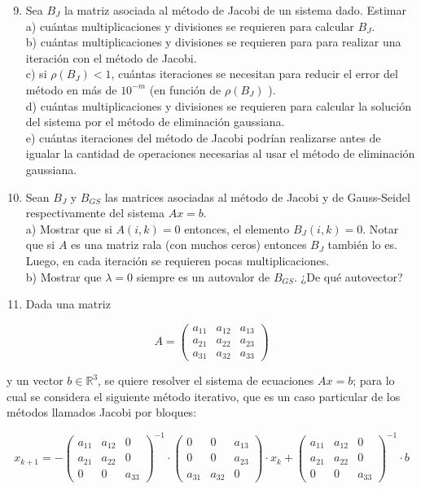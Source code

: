 \documentclass[10pt]{book}
\begin{document}
\begin{enumerate}
  \setcounter{enumi}{8}
  \item Sea $B_{J}$ la matriz asociada al método de Jacobi de un sistema dado. Estimar\\
a) cuántas multiplicaciones y divisiones se requieren para calcular $B_{J}$.\\
b) cuántas multiplicaciones y divisiones se requieren para para realizar una iteración con el método de Jacobi.\\
c) si $\rho\left(B_{J}\right)<1$, cuántas iteraciones se necesitan para reducir el error del método en más de $10^{-m}$ (en función de $\rho\left(B_{J}\right)$ ).\\
d) cuántas multiplicaciones y divisiones se requieren para calcular la solución del sistema por el método de eliminación gaussiana.\\
e) cuántas iteraciones del método de Jacobi podrían realizarse antes de igualar la cantidad de operaciones necesarias al usar el método de eliminación gaussiana.
  \item Sean $B_{J}$ y $B_{G S}$ las matrices asociadas al método de Jacobi y de Gauss-Seidel respectivamente del sistema $A x=b$.\\
a) Mostrar que si $A(i, k)=0$ entonces, el elemento $B_{J}(i, k)=0$. Notar que si $A$ es una matriz rala (con muchos ceros) entonces $B_{J}$ también lo es. Luego, en cada iteración se requieren pocas multiplicaciones.\\
b) Mostrar que $\lambda=0$ siempre es un autovalor de $B_{G S}$. ¿De qué autovector?
  \item Dada una matriz
\end{enumerate}

$$
A=\left(\begin{array}{lll}
a_{11} & a_{12} & a_{13} \\
a_{21} & a_{22} & a_{23} \\
a_{31} & a_{32} & a_{33}
\end{array}\right)
$$

y un vector $b \in \mathbb{R}^{3}$, se quiere resolver el sistema de ecuaciones $A x=b$; para lo cual se considera el siguiente método iterativo, que es un caso particular de los métodos llamados Jacobi por bloques:

$$
x_{k+1}=-\left(\begin{array}{ccc}
a_{11} & a_{12} & 0 \\
a_{21} & a_{22} & 0 \\
0 & 0 & a_{33}
\end{array}\right)^{-1} \cdot\left(\begin{array}{ccc}
0 & 0 & a_{13} \\
0 & 0 & a_{23} \\
a_{31} & a_{32} & 0
\end{array}\right) \cdot x_{k}+\left(\begin{array}{ccc}
a_{11} & a_{12} & 0 \\
a_{21} & a_{22} & 0 \\
0 & 0 & a_{33}
\end{array}\right)^{-1} \cdot b
$$
\end{document}
